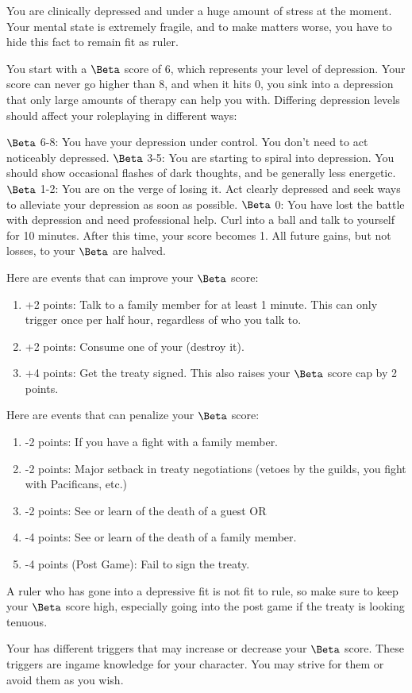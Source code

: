 \documentclass[green]{NeptuneBall}
\begin{document}
\name{\gSpellBreak{}}

You are clinically depressed and under a huge amount of stress at the moment. Your mental state is extremely fragile, and to make matters worse, you have to hide this fact to remain fit as ruler.

You start with a $\Beta$ score of 6, which represents your level of depression. Your score can never go higher than 8, and when it hits 0, you sink into a depression that only large amounts of therapy can help you with. Differing depression levels should affect your roleplaying in different ways:

$\Beta$ 6-8: You have your depression under control. You don't need to act noticeably depressed.
$\Beta$ 3-5: You are starting to spiral into depression. You should show occasional flashes of dark thoughts, and be generally less energetic.
$\Beta$ 1-2: You are on the verge of losing it. Act clearly depressed and seek ways to alleviate your depression as soon as possible.
$\Beta$ 0: You have lost the battle with depression and need professional help. Curl into a ball and talk to yourself for 10 minutes. After this time, your score becomes 1. All future gains, but not losses, to your $\Beta$ are halved.

Here are events that can improve your $\Beta$ score: 

\begin{enumerate}
\item +2 points: Talk to a family member for at least 1 minute. This can only trigger once per half hour, regardless of who you talk to.
\item +2 points: Consume one of your \iTablets{} (destroy it).
\item +4 points: Get the treaty signed. This also raises your $\Beta$ score cap by 2 points.
\end{enumerate}

Here are events that can penalize your $\Beta$ score:

\begin{enumerate}
\item -2 points: If you have a fight with a family member.
\item -2 points: Major setback in treaty negotiations (vetoes by the guilds, you fight with Pacificans, etc.)
\item -2 points: See or learn of the death of a guest OR
\item -4 points: See or learn of the death of a family member.
\item -4 points (Post Game): Fail to sign the treaty.
\end{enumerate}

A ruler who has gone into a depressive fit is not fit to rule, so make sure to keep your $\Beta$ score high, especially going into the post game if the treaty is looking tenuous. 

Your \mDepression{} has different triggers that may increase or decrease your $\Beta$ score. These triggers are ingame knowledge for your character. You may strive for them or avoid them as you wish.
\end{document}
